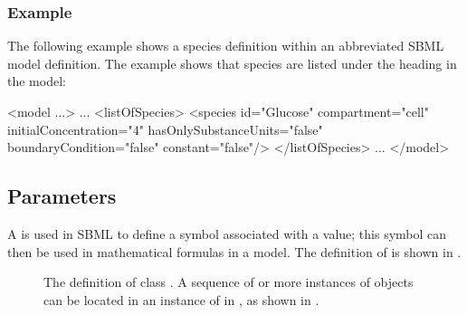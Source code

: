 \subsubsection{Example}

The following example shows a species definition within an
abbreviated SBML model definition.  The example shows that species
are listed under the heading  in the model:

\begin{example}
<model ...>
    ...
    <listOfSpecies>
        <species id="Glucose" compartment="cell" initialConcentration="4"
                 hasOnlySubstanceUnits="false" boundaryCondition="false" constant="false"/>
    </listOfSpecies>
    ...
</model>
\end{example}


\subsection{Parameters}
\label{sec:parameters}

A \Parameter is used in SBML to define a symbol associated with a
value; this symbol can then be used in mathematical formulas in a
model. The definition of
\Parameter is shown in .

\begin{figure}[htb]
  \vspace*{-1ex}
  \centering
  \small
  \caption{The definition of class \Parameter.  A
      sequence of  or more instances of \Parameter objects can
      be located in an instance of \ListOfParameters in \Model, as
      shown in \protect{}.}
  \label{fig:parameter}
\end{figure}

